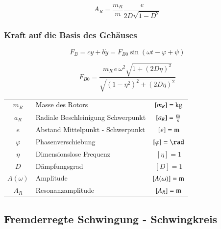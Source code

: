 $$ A_R = \frac{m_R}{m} \frac{e}{2D \sqrt{1 - D^2}}  $$




\subsubsection{Kraft auf die Basis des Gehäuses} 

\begin{minipage}{0.48\linewidth}
$$ F_B = c y + b \dot{y} = F_{B0} \sin(\omega t - \varphi + \psi) $$ 
\end{minipage}
\hfill
\begin{minipage}{0.48\linewidth}
$$\boxed{ F_{B0} = \frac{m_R \, e \, \omega^2 \sqrt{1+ (2D \eta)^2}}{\sqrt{(1 - \eta^2)^2 + (2 D \eta)^2}} } $$ 
\end{minipage}
\vspace{0.2cm}


\begin{tabular}{c l c}
$m_R$ & Masse des Rotors & $[m_R] = \mathrm{kg}$ \\
$a_R$ & Radiale Beschleinigung Schwerpunkt & $[a_R] = \frac{\mathrm{m}}{\mathrm{s}}$ \\
$e$ & Abstand Mittelpunkt - Schwerpunkt & $[e] = \mathrm{m}$ \\
$\varphi$ & Phasenverschiebung & $[ \varphi] = \rad$ \\
$\eta$ & Dimensionslose Frequenz & $[\eta] = 1$  \\
$D$ & Dämpfungsgrad & $[D] = 1$  \\
$A(\omega)$ & Amplitude & $[A(\omega)] = \mathrm{m}$ \\
$A_R$ & Resonanzamplitude & $[A_R] = \mathrm{m}$
\end{tabular}




\subsection{Fremderregte Schwingung - Schwingkreis}

